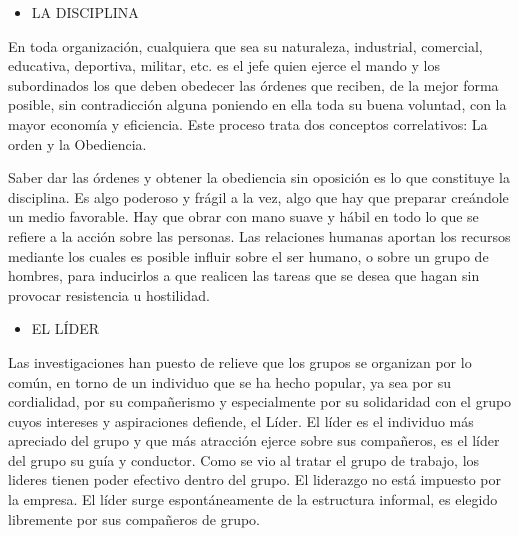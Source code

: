 \begin{itemize}
  \item LA DISCIPLINA
\end{itemize}
En toda organización, cualquiera que sea su naturaleza, industrial, comercial, educativa, deportiva, militar, etc. es el jefe quien ejerce el mando y los subordinados los que deben obedecer las órdenes que reciben, de la mejor forma posible, sin contradicción alguna poniendo en ella toda su buena voluntad, con la mayor economía y eficiencia. Este proceso trata dos conceptos correlativos: La orden y la Obediencia.

Saber dar las órdenes y obtener la obediencia sin oposición es lo que constituye la disciplina. Es algo poderoso y frágil a la vez, algo que hay que preparar creándole un medio favorable. Hay que obrar con mano suave y hábil en todo lo que se refiere a la acción sobre las personas. Las relaciones humanas aportan los recursos mediante los cuales es posible influir sobre el ser humano, o sobre un grupo de hombres, para inducirlos a que realicen las tareas que se desea que hagan sin provocar resistencia u hostilidad.

\begin{itemize}
  \item EL LÍDER
\end{itemize}
Las investigaciones han puesto de relieve que los grupos se organizan por lo común, en torno de un individuo que se ha hecho popular, ya sea por su cordialidad, por su compañerismo y especialmente por su solidaridad con el grupo cuyos intereses y aspiraciones defiende, el Líder. El líder es el individuo más apreciado del grupo y que más atracción ejerce sobre sus compañeros, es el líder del grupo su guía y conductor. Como se vio al tratar el grupo de trabajo, los lideres tienen poder efectivo dentro del grupo. El liderazgo no está impuesto por la empresa. El líder surge espontáneamente de la estructura informal, es elegido libremente por sus compañeros de grupo.




